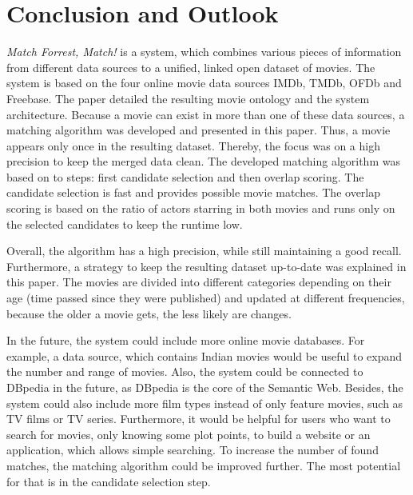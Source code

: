 \section{Conclusion and Outlook}
\label{sec_conclusion}

\emph{Match Forrest, Match!} is a system, which combines various pieces of information from different data sources to a unified, linked open dataset of movies.
The system is based on the four online movie data sources IMDb, TMDb, OFDb and Freebase.
The paper detailed the resulting movie ontology and the system architecture.
Because a movie can exist in more than one of these data sources, a matching algorithm was developed and presented in this paper.
Thus, a movie appears only once in the resulting dataset.
Thereby, the focus was on a high precision to keep the merged data clean.
The developed matching algorithm was based on to steps: first candidate selection and then overlap scoring.
The candidate selection is fast and provides possible movie matches.
The overlap scoring is based on the ratio of actors starring in both movies and runs only on the selected candidates to keep the runtime low.

Overall, the algorithm has a high precision, while still maintaining a good recall.
Furthermore, a strategy to keep the resulting dataset up-to-date was explained in this paper.
The movies are divided into different categories depending on their age (time passed since they were published) and updated at different frequencies, because the older a movie gets, the less likely are changes.

In the future, the system could include more online movie databases.
For example, a data source, which contains Indian movies would be useful to expand the number and range of movies.
Also, the system could be connected to DBpedia in the future, as DBpedia is the core of the Semantic Web.
Besides, the system could also include more film types instead of only feature movies, such as TV films or TV series.
Furthermore, it would be helpful for users who want to search for movies, only knowing some plot points, to build a website or an application, which allows simple searching.
To increase the number of found matches, the matching algorithm could be improved further.
The most potential for that is in the candidate selection step.
